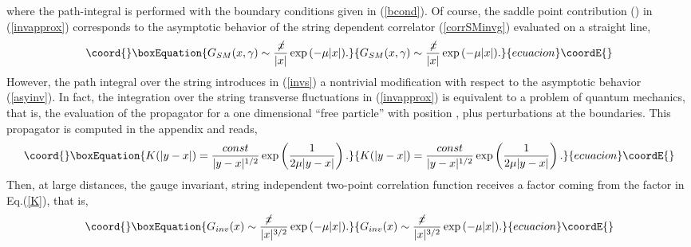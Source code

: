 \documentclass[a4paper,12pt]{article}
\begin{document}
where the \myHighlight{$\varepsilon$}\coordHE{} path-integral is performed with the boundary conditions given in (\ref{bcond}). Of course, the saddle point contribution (\coordHE{}) in (\ref{invapprox}) corresponds to the asymptotic behavior of the string dependent correlator (\ref{corrSMinvg}) evaluated on a straight line,
\begin{equation}\coord{}\boxEquation{
G_{SM}(x,\gamma)\sim \frac{\not\! x}{|x|} \exp {(-\mu |x|)}.
\label{asyinv}
}{
G_{SM}(x,\gamma)\sim \frac{\not\! x}{|x|} \exp {(-\mu |x|)}.
}{ecuacion}\coordE{}\end{equation}
However, the path integral over the string introduces in (\ref{invs}) a nontrivial modification with respect to the asymptotic behavior (\ref{asyinv}). In fact, the integration over the 
string transverse fluctuations in (\ref{invapprox}) is equivalent to a problem of quantum mechanics, that is, 
the evaluation of the propagator for a one dimensional ``free particle'' with position \myHighlight{$\varepsilon$}\coordHE{}, plus perturbations at the boundaries. This propagator is computed in the appendix and reads,
\begin{equation}\coord{}\boxEquation{
K(|y-x|)=\frac{const}{|y-x|^{1/2}} \exp\left( \frac{1}{2\mu|y-x|}\right).
\label{K}
}{
K(|y-x|)=\frac{const}{|y-x|^{1/2}} \exp\left( \frac{1}{2\mu|y-x|}\right).
}{ecuacion}\coordE{}\end{equation}
Then, at large distances, the gauge invariant, string independent two-point correlation 
function receives a factor \coordHE{} coming from the factor \coordHE{} in Eq.(\ref{K}), that is, 
\begin{equation}\coord{}\boxEquation{
G_{inv}(x) \sim \frac{\not\! x~~~}{|x|^{3/2}} \exp {(-\mu |x|)}.
\label{inv-asym}
}{
G_{inv}(x) \sim \frac{\not\! x~~~}{|x|^{3/2}} \exp {(-\mu |x|)}.
}{ecuacion}\coordE{}\end{equation}
\end{document}
